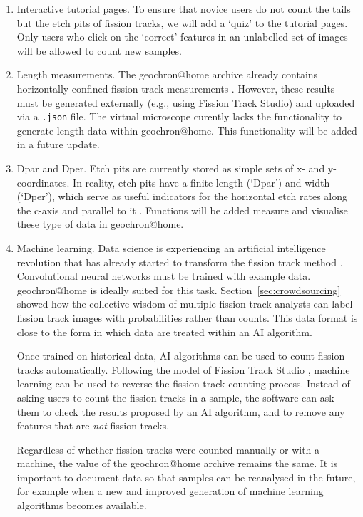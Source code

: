\documentclass[gchron, manuscript]{copernicus}
\begin{document}
\begin{enumerate}
\item Interactive tutorial pages. To ensure that novice users do not
  count the tails but the etch pits of fission tracks, we will add a
  `quiz' to the tutorial pages. Only users who click on the `correct'
  features in an unlabelled set of images will be allowed to count new
  samples.
\item Length measurements. The geochron@home archive already
  contains horizontally confined fission track measurements
  \citep{tamer2025}.  However, these results must be generated
  externally (e.g., using Fission Track Studio) and uploaded via a
  \texttt{.json} file.  The virtual microscope curently lacks the
  functionality to generate length data within
  geochron@home. This functionality will be added in a future
  update.
\item Dpar and Dper. Etch pits are currently stored as simple sets of
  x- and y-coordinates.  In reality, etch pits have a finite length
  (`Dpar') and width (`Dper'), which serve as useful indicators for
  the horizontal etch rates along the c-axis and parallel to it
  \citep{donelick1993}. Functions will be added measure and visualise
  these type of data in geochron@home.
\item Machine learning. Data science is experiencing an artificial
  intelligence revolution that has already started to transform the
  fission track method \citep{nachtergaele2020}.  Convolutional neural
  networks must be trained with example data. geochron@home
  is ideally suited for this task. Section~\ref{sec:crowdsourcing}
  showed how the collective wisdom of multiple fission track analysts
  can label fission track images with probabilities rather than
  counts. This data format is close to the form in which data are
  treated within an AI algorithm.\medskip

  Once trained on historical data, AI algorithms can be used to count
  fission tracks automatically. Following the model of Fission Track
  Studio \citep{gleadow2009, gleadow2019}, machine learning can be
  used to reverse the fission track counting process. Instead of
  asking users to count the fission tracks in a sample, the software
  can ask them to check the results proposed by an AI algorithm, and
  to remove any features that are \emph{not} fission tracks.\medskip

  Regardless of whether fission tracks were counted manually or with a
  machine, the value of the geochron@home archive remains the
  same. It is important to document data so that samples can be
  reanalysed in the future, for example when a new and improved
  generation of machine learning algorithms becomes available.
\end{enumerate}
\end{document}
